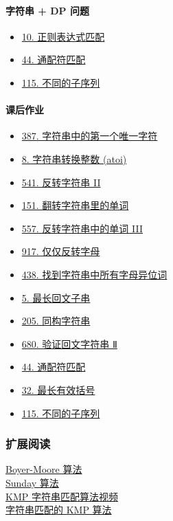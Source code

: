\paragraph{字符串 + DP 问题}

\begin{itemize}
  \item \hyperref[leetcode:10]{10. 正则表达式匹配}
  \item \hyperref[leetcode:44]{44. 通配符匹配}
  \item \hyperref[leetcode:115]{115. 不同的子序列}
\end{itemize}

\paragraph{课后作业}

\begin{itemize}
  \item \hyperref[leetcode:387]{387. 字符串中的第一个唯一字符}
  \item \hyperref[leetcode:8]{8. 字符串转换整数 (atoi)}
  \item \hyperref[leetcode:541]{541. 反转字符串 II}
  \item \hyperref[leetcode:151]{151. 翻转字符串里的单词}
  \item \hyperref[leetcode:557]{557. 反转字符串中的单词 III}
  \item \hyperref[leetcode:917]{917. 仅仅反转字母}
  \item \hyperref[leetcode:438]{438. 找到字符串中所有字母异位词}
  \item \hyperref[leetcode:5]{5. 最长回文子串}
  \item \hyperref[leetcode:205]{205. 同构字符串}
  \item \hyperref[leetcode:680]{680. 验证回文字符串 Ⅱ}
  \item \hyperref[leetcode:44]{44. 通配符匹配}
  \item \hyperref[leetcode:32]{32. 最长有效括号}
  \item \hyperref[leetcode:115]{115. 不同的子序列}
\end{itemize}

\subsubsection{扩展阅读}

\href{https://www.ruanyifeng.com/blog/2013/05/boyer-moore_string_search_algorithm.html}{Boyer-Moore 算法} \\
\href{https://blog.csdn.net/u012505432/article/details/52210975}{Sunday 算法} \\
\href{https://www.bilibili.com/video/av11866460?from=search&seid=17425875345653862171}{KMP 字符串匹配算法视频} \\
\href{http://www.ruanyifeng.com/blog/2013/05/Knuth%E2%80%93Morris%E2%80%93Pratt_algorithm.html}{字符串匹配的 KMP 算法}

